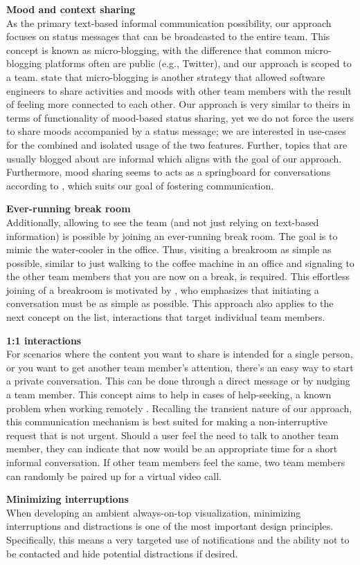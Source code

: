\medskip\noindent\textbf{Mood and context sharing} \\
As the primary text-based informal communication possibility, our approach focuses on status messages that can be broadcasted to the entire team. This concept is known as micro-blogging, with the difference that common micro-blogging platforms often are public (e.g., Twitter), and our approach is scoped to a team. \textcite{dullemond2013fixing} state that micro-blogging is another strategy that allowed software engineers to share activities and moods with other team members with the result of feeling more connected to each other. Our approach is very similar to theirs in terms of functionality of mood-based status sharing, yet we do not force the users to share moods accompanied by a status message; we are interested in use-cases for the combined and isolated usage of the two features. Further, topics that are usually blogged about are informal \autocite{ehrlich2010microblogging} which aligns with the goal of our approach. Furthermore, mood sharing seems to acts as a springboard for conversations according to \textcite{church2010study}, which suits our goal of fostering communication.

\medskip\noindent\textbf{Ever-running break room} \\
Additionally, allowing to see the team (and not just relying on text-based information) is possible by joining an ever-running break room. The goal is to mimic the water-cooler in the office. Thus, visiting a breakroom as simple as possible, similar to just walking to the coffee machine in an office and signaling to the other team members that you are now on a break, is required. This effortless joining of a breakroom is motivated by \textcite{chang2007out}, who emphasizes that initiating a conversation must be as simple as possible. This approach also applies to the next concept on the list, interactions that target individual team members.

\medskip\noindent\textbf{1:1 interactions} \\
For scenarios where the content you want to share is intended for a single person, or you want to get another team member's attention, there's an easy way to start a private conversation. This can be done through a direct message or by nudging a team member. This concept aims to help in cases of help-seeking, a known problem when working remotely \autocite{herbsleb2003empirical}. Recalling the transient nature of our approach, this communication mechanism is best suited for making a non-interruptive request that is not urgent. Should a user feel the need to talk to another team member, they can indicate that now would be an appropriate time for a short informal conversation. If other team members feel the same, two team members can randomly be paired up for a virtual video call.

\medskip\noindent\textbf{Minimizing interruptions} \\
When developing an ambient always-on-top visualization, minimizing interruptions and distractions is one of the most important design principles. Specifically, this means a very targeted use of notifications and the ability not to be contacted and hide potential distractions if desired.